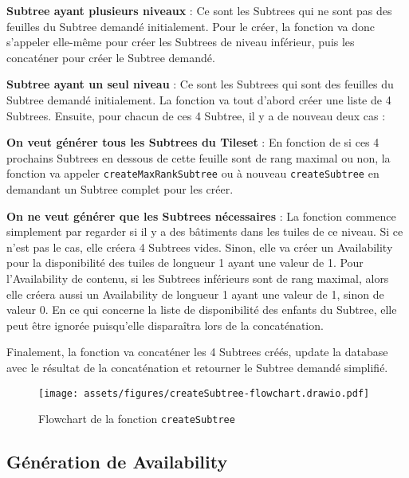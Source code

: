     \noindent\hspace*{\fill}\parbox{0.9\textwidth}{\textbf{Subtree ayant plusieurs niveaux} : Ce sont les Subtrees qui ne sont pas des feuilles du Subtree demandé initialement. Pour le créer, la fonction va donc s'appeler elle-même pour créer les Subtrees de niveau inférieur, puis les concaténer pour créer le Subtree demandé.
    }

    \noindent\hspace*{\fill}\parbox{0.9\textwidth}{\textbf{Subtree ayant un seul niveau} : Ce sont les Subtrees qui sont des feuilles du Subtree demandé initialement. La fonction va tout d'abord créer une liste de 4 Subtrees. Ensuite, pour chacun de ces 4 Subtree, il y a de nouveau deux cas :
    }

        \noindent\hspace*{\fill}\parbox{0.8\textwidth}{\textbf{On veut générer tous les Subtrees du Tileset} : En fonction de si ces 4 prochains Subtrees en dessous de cette feuille sont de rang maximal ou non, la fonction va appeler \texttt{createMaxRankSubtree} ou à nouveau \texttt{createSubtree} en demandant un Subtree complet pour les créer.
        }

        \noindent\hspace*{\fill}\parbox{0.8\textwidth}{\textbf{On ne veut générer que les Subtrees nécessaires} : La fonction commence simplement par regarder si il y a des bâtiments dans les tuiles de ce niveau. Si ce n'est pas le cas, elle créera 4 Subtrees vides. Sinon, elle va créer un Availability pour la disponibilité des tuiles de longueur 1 ayant une valeur de 1. Pour l'Availability de contenu, si les Subtrees inférieurs sont de rang maximal, alors elle créera aussi un Availability de longueur 1 ayant une valeur de 1, sinon de valeur 0. En ce qui concerne la liste de disponibilité des enfants du Subtree, elle peut être ignorée puisqu'elle disparaîtra lors de la concaténation.
        }

    Finalement, la fonction va concaténer les 4 Subtrees créés, update la database avec le résultat de la concaténation et retourner le Subtree demandé simplifié.

\begin{figure}[H]
    \centering
    \texttt{[image: assets/figures/createSubtree-flowchart.drawio.pdf]}
    \caption{Flowchart de la fonction \texttt{createSubtree}}
    \label{fig:createsubtree-flowchart}
\end{figure}

\newpage
\subsection{Génération de Availability}
\label{sec:availability-gen}

